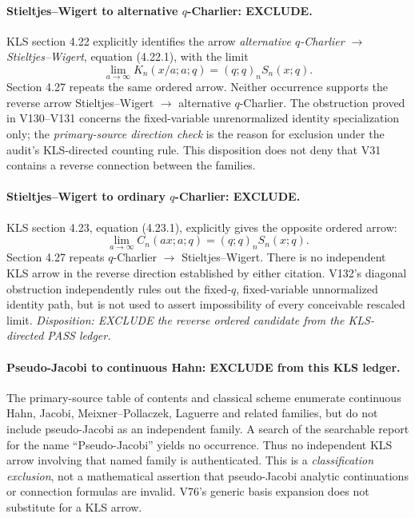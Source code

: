 \documentclass[11pt]{article}
\begin{document}
\paragraph{Stieltjes--Wigert to alternative $q$-Charlier: EXCLUDE.}
KLS section 4.22 explicitly identifies the arrow
\emph{alternative $q$-Charlier $\to$ Stieltjes--Wigert}, equation
(4.22.1), with the limit
\[
 \lim_{a\to\infty}K_n(x/a;a;q)=(q;q)_n S_n(x;q).
\]
Section 4.27 repeats the same ordered arrow.  Neither occurrence
supports the reverse arrow Stieltjes--Wigert $\to$ alternative
$q$-Charlier.  The obstruction proved in V130--V131 concerns the
fixed-variable unrenormalized identity specialization only; the
\emph{primary-source direction check} is the reason for exclusion
under the audit's KLS-directed counting rule.  This disposition does
not deny that V31 contains a reverse connection between the families.

\paragraph{Stieltjes--Wigert to ordinary $q$-Charlier: EXCLUDE.}
KLS section 4.23, equation (4.23.1), explicitly gives the opposite
ordered arrow:
\[
 \lim_{a\to\infty} C_n(ax;a;q)=(q;q)_n S_n(x;q).
\]
Section 4.27 repeats $q$-Charlier $\to$ Stieltjes--Wigert.
There is no independent KLS arrow in the reverse direction established
by either citation.  V132's diagonal obstruction independently rules
out the fixed-$q$, fixed-variable unnormalized identity path, but is
not used to assert impossibility of every conceivable rescaled limit.
\emph{Disposition: EXCLUDE the reverse ordered candidate from the
KLS-directed PASS ledger.}

\paragraph{Pseudo-Jacobi to continuous Hahn: EXCLUDE from this KLS ledger.}
The primary-source table of contents and classical scheme enumerate
continuous Hahn, Jacobi, Meixner--Pollaczek, Laguerre and related
families, but do not include pseudo-Jacobi as an independent family.
A search of the searchable report for the name ``Pseudo-Jacobi'' yields
no occurrence.  Thus no independent KLS arrow involving that named
family is authenticated.  This is a \emph{classification exclusion},
not a mathematical assertion that pseudo-Jacobi analytic
continuations or connection formulas are invalid.  V76's generic
basis expansion does not substitute for a KLS arrow.
\end{document}
